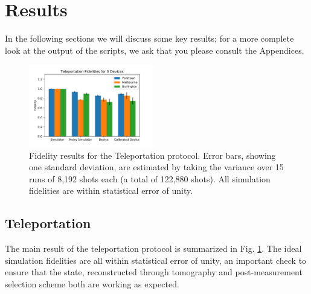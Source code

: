 \section{Results}

In the following sections we will discuss some key results;
for a more complete look at the output of the scripts, we ask that you please
consult the Appendices.
\begin{figure}[h!] \centering \includegraphics[width=0.48\textwidth]{images/results/teleport_histogram.pdf}
	\caption{Fidelity results for the Teleportation protocol. Error bars, showing
    one standard deviation, are estimated by taking the variance over 15 runs of
    8,192 shots each (a total of 122,880 shots). All simulation fidelities are
    within statistical error of unity.}
	\label{fig:teleport_histogram}
\end{figure}
\subsection{Teleportation}

The main result of the teleportation protocol is summarized in Fig.
\ref{fig:teleport_histogram}. The ideal simulation fidelities are all within
statistical error of unity, an important check to ensure that the state,
reconstructed through tomography and post-measurement selection scheme both are
working as expected.

